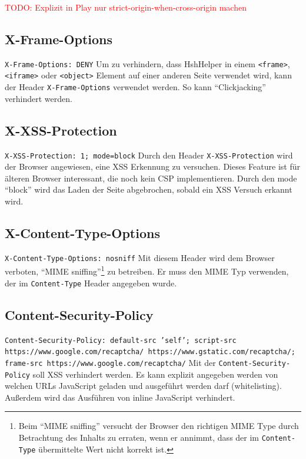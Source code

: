 \documentclass[12pt,DIV14,BCOR10mm,a4paper,twoside,parskip=half-,headsepline,headinclude,english,ngerman,bibliography=totocnumbered]{scrreprt}
\begin{document}
\textcolor{red}{
TODO: Explizit in Play nur strict-origin-when-cross-origin machen
}
\subsection{X-Frame-Options}
\texttt{X-Frame-Options: DENY}\newline
Um zu verhindern, dass HshHelper in einem \texttt{<frame>}, \texttt{<iframe>} oder \texttt{<object>} Element auf einer anderen Seite verwendet wird, kann der Header \texttt{X-Frame-Options} verwendet werden. So kann \enquote{Clickjacking} verhindert werden.

\subsection{X-XSS-Protection}
\texttt{X-XSS-Protection: 1; mode=block}\newline
Durch den Header \texttt{X-XSS-Protection} wird der Browser angewiesen, eine XSS Erkennung zu versuchen. Dieses Feature ist für älteren Browser interessant, die noch kein CSP implementieren. Durch den mode \enquote{block} wird das Laden der Seite abgebrochen, sobald ein XSS Versuch erkannt wird.

\subsection{X-Content-Type-Options}
\texttt{X-Content-Type-Options: nosniff}\newline
Mit diesem Header wird dem Browser verboten, \enquote{MIME sniffing}\footnote{Beim \enquote{MIME sniffing} versucht der Browser den richtigen MIME Type durch Betrachtung des Inhalts zu erraten, wenn er annimmt, dass der im \texttt{Content-Type} übermittelte Wert nicht korrekt ist.} zu betreiben. Er muss den MIME Typ verwenden, der im \texttt{Content-Type} Header angegeben wurde.

\subsection{Content-Security-Policy}
\texttt{Content-Security-Policy: default-src 'self'; script-src https://www.google.com/recaptcha/ https://www.gstatic.com/recaptcha/; frame-src https://www.google.com/recaptcha/}\newline
Mit der \texttt{Content-Security-Policy} soll XSS verhindert werden. Es kann explizit angegeben werden von welchen URLs JavaScript geladen und ausgeführt werden darf (whitelisting). Außerdem wird das Ausführen von inline JavaScript verhindert.
\end{document}
